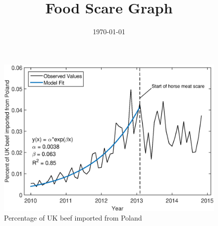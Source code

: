 \documentclass[10pt]{article}
\begin{document}
\title{Food Scare Graph}
\date{\today}
\maketitle

\begin{figure}[ht]
  \centering
  \includegraphics[width=1\linewidth]{beef_model.eps}
\caption{Percentage of UK beef imported from Poland}
\label{fig:beef_model}
\end{figure}
\end{document}

